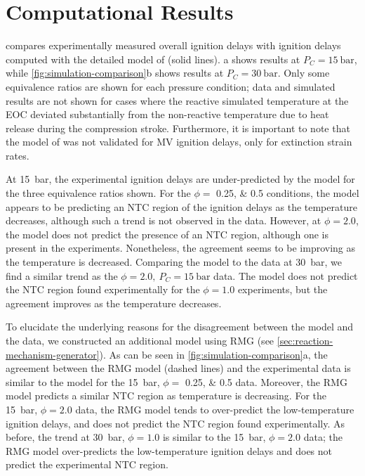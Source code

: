 \documentclass[letterpaper, review]{elsarticle}
\begin{document}
\section{Computational Results}\label{sec:computational-results}

 compares experimentally measured overall ignition delays with
ignition delays computed with the detailed model of \citet{Dievart2013} (solid lines).
a shows results at \(P_C = \SI{15}{\bar}\), while
\cref{fig:simulation-comparison}b shows results at \(P_C = \SI{30}{\bar}\). Only some equivalence
ratios are shown for each pressure condition; data and simulated results are not shown for cases
where the reactive simulated temperature at the EOC deviated substantially from the non-reactive
temperature due to heat release during the compression stroke. Furthermore, it is important to note
that the model of \citet{Dievart2013} was not validated for MV ignition delays, only for extinction
strain rates.

\begin{center}
    \captionsetup{type=figure}
    \resizebox{\textwidth}{!}{}
    \caption{Comparison of experimental and simulated results. a) \SI{15}{\bar}; b) \SI{30}{\bar}}
    \label{fig:simulation-comparison}
\end{center}

At \SI{15}{\bar}, the experimental ignition delays are under-predicted by the \citet{Dievart2013}
model for the three equivalence ratios shown. For the \(\phi =\) \numlist{0.25;0.5} conditions, the
model appears to be predicting an NTC region of the ignition delays as the temperature decreases,
although such a trend is not observed in the data. However, at \(\phi = 2.0\), the model does not
predict the presence of an NTC region, although one is present in the experiments. Nonetheless, the
agreement seems to be improving as the temperature is decreased. Comparing the \citet{Dievart2013}
model to the data at \SI{30}{\bar}, we find a similar trend as the \(\phi=2.0,\ P_C=\SI{15}{\bar}\)
data. The model does not predict the NTC region found experimentally for the \(\phi = 1.0\)
experiments, but the agreement improves as the temperature decreases.

To elucidate the underlying reasons for the disagreement between the \citet{Dievart2013} model and
the data, we constructed an additional model using RMG (see
\cref{sec:reaction-mechanism-generator}). As can be seen in \cref{fig:simulation-comparison}a, the
agreement between the RMG model (dashed lines) and the experimental data is similar to the
\citet{Dievart2013} model for the \SI{15}{\bar}, \(\phi =\) \numlist{0.25; 0.5} data. Moreover, the
RMG model predicts a similar NTC region as temperature is decreasing. For the \SI{15}{\bar},
\(\phi = 2.0\) data, the RMG model tends to over-predict the low-temperature ignition delays, and
does not predict the NTC region found experimentally. As before, the trend at \SI{30}{\bar},
\(\phi=1.0\) is similar to the \SI{15}{\bar}, \(\phi=2.0\) data; the RMG model over-predicts the
low-temperature ignition delays and does not predict the experimental NTC region.
\end{document}
